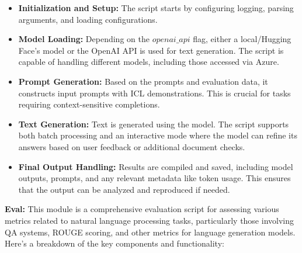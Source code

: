 \begin{itemize}
    \item \textbf{Initialization and Setup:} The script starts by configuring logging, parsing arguments, and loading configurations.

    \item \textbf{Model Loading:} Depending on the $openai\_api$ flag, either a local/Hugging Face's model or the OpenAI API is used for text generation. The script is capable of handling different models, including those accessed via Azure.

    \item \textbf{Prompt Generation:} Based on the prompts and evaluation data, it constructs input prompts with ICL demonstrations. This is crucial for tasks requiring context-sensitive completions.

    \item \textbf{Text Generation:} Text is generated using the model. The script supports both batch processing and an interactive mode where the model can refine its answers based on user feedback or additional document checks.

    \item \textbf{Final Output Handling:} Results are compiled and saved, including model outputs, prompts, and any relevant metadata like token usage. This ensures that the output can be analyzed and reproduced if needed.
\end{itemize}

\textbf{Eval:} This module is a comprehensive evaluation script for assessing various metrics related to natural language processing tasks, particularly those involving QA systems, ROUGE scoring, and other metrics for language generation models. Here's a breakdown of the key components and functionality:

